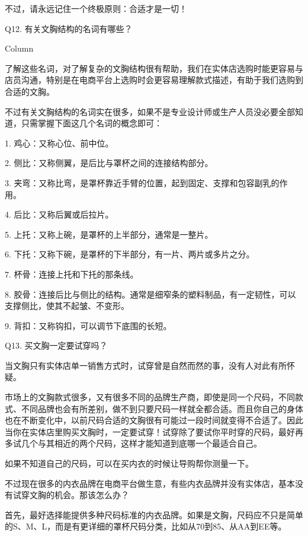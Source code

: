 \documentclass[12pt,UTF8]{ctexbook}
\begin{document}
不过，请永远记住一个终极原则：合适才是一切！





Q12. 有关文胸结构的名词有哪些？



Column

了解这些名词，对了解复杂的文胸结构很有帮助，我们在实体店选购时能更容易与店员沟通，特别是在电商平台上选购时会更容易理解款式描述，有助于我们选购到合适的文胸。

不过有关文胸结构的名词实在很多，如果不是专业设计师或生产人员没必要全部知道，只需掌握下面这几个名词的概念即可：



1. 鸡心：又称心位、前中位。

2. 侧比：又称侧翼，是后比与罩杯之间的连接结构部分。

3. 夹弯：又称比弯，是罩杯靠近手臂的位置，起到固定、支撑和包容副乳的作用。

4. 后比：又称后翼或后拉片。

5. 上托：又称上碗，是罩杯的上半部分，通常是一整片。

6. 下托：又称下碗，是罩杯的下半部分，有一片、两片或多片之分。

7. 杯骨：连接上托和下托的那条线。

8. 胶骨：连接后比与侧比的结构。通常是细窄条的塑料制品，有一定韧性，可以支撑侧比，使其不起皱、不变形。

9. 背扣：又称钩扣，可以调节下底围的长短。





Q13. 买文胸一定要试穿吗？


当文胸只有实体店单一销售方式时，试穿曾是自然而然的事，没有人对此有所怀疑。

市场上的文胸款式很多，又有很多不同的品牌生产商，即使是同一个尺码，不同款式、不同品牌也会有所差别，做不到只要尺码一样就全都合适。而且你自己的身体也在不断变化中，以前尺码合适的文胸很有可能过一段时间就变得不合适了。因此当你在实体店里购买文胸时，一定要试穿！试穿除了要试你平时穿的尺码，最好再多试几个与其相近的两个尺码，这样才能知道到底哪一个最适合自己。

如果不知道自己的尺码，可以在买内衣的时候让导购帮你测量一下。

不过现在很多的内衣品牌在电商平台做生意，有些内衣品牌并没有实体店，基本没有试穿文胸的机会。那该怎么办？

首先，最好选择能提供多种尺码标准的内衣品牌。如果是文胸，尺码应不只是简单的S、M、L，而是有更详细的罩杯尺码分类，比如从70到85、从AA到EE等。
\end{document}
